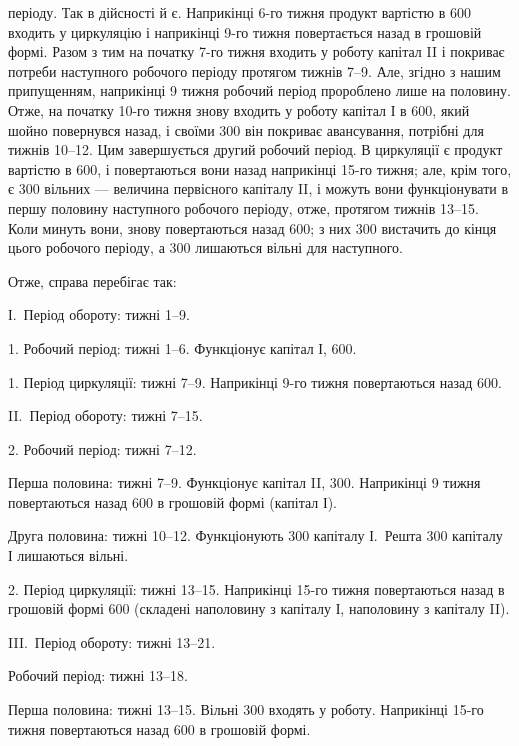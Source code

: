 \parcont{}  %
періоду. Так в дійсності й є. Наприкінці 6-го тижня продукт вартістю
в 600 входить у циркуляцію і наприкінці 9-го тижня повертається
назад в грошовій формі. Разом з тим на початку 7-го тижня
входить у роботу капітал II і покриває потреби наступного робочого
періоду протягом тижнів 7--9. Але, згідно з нашим припущенням, наприкінці
9 тижня робочий період пророблено лише на половину. Отже, на
початку 10-го тижня знову входить у роботу капітал І в 600,
який шойно повернувся назад, і своїми 300 він покриває авансування,
потрібні для тижнів 10--12. Цим завершується другий робочий
період. В циркуляції є продукт вартістю в 600, і повертаються
вони назад наприкінці 15-го тижня; але, крім того, є 300
вільних — величина первісного капіталу II, і можуть вони функціонувати
в першу половину наступного робочого періоду, отже, протягом тижнів
13--15. Коли минуть вони, знову повертаються назад 600;
з них 300 вистачить до кінця цього робочого періоду, а
300 лишаються вільні для наступного.

Отже, справа перебігає так:

І.~Період обороту: тижні 1--9.

1. Робочий період: тижні 1--6. Функціонує капітал І, 600.

1. Період циркуляції: тижні 7--9. Наприкінці 9-го тижня повертаються
назад 600.

II.~Період обороту: тижні 7--15.

2. Робочий період: тижні 7--12.

Перша половина: тижні 7--9. Функціонує капітал II, 300.
Наприкінці 9 тижня повертаються назад 600 в грошовій формі
(капітал І).

Друга половина: тижні 10--12. Функціонують 300 капіталу
І.~Решта 300 капіталу І лишаються вільні.

2. Період циркуляції: тижні 13--15. Наприкінці 15-го тижня повертаються
назад в грошовій формі 600 (складені наполовину
з капіталу І, наполовину з капіталу II).

III.~Період обороту: тижні 13--21.

Робочий період: тижні 13--18.

Перша половина: тижні 13--15. Вільні 300 входять у
роботу. Наприкінці 15-го тижня повертаються назад 600 в грошовій
формі.

